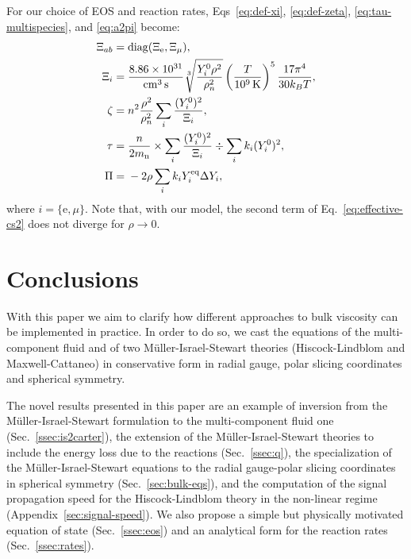 \documentclass[aps,prd,twocolumn,a4paper,floatfix,nofootbib,superscriptaddress,nofootinbib]{revtex4}
\newcommand{\re}{\mathrm{e}}
\newcommand{\rn}{\mathrm{n}}
\newcommand{\req}{\mathrm{eq}}
\begin{document}
For our choice of EOS and reaction rates, Eqs~\eqref{eq:def-xi}, \eqref{eq:def-zeta}, \eqref{eq:tau-multispecies},
and \eqref{eq:a2pi} become:
%
\begin{align}
\Xi_{ab}={}& \mathrm{diag}(\Xi_\re,\Xi_\mu),\\
\Xi_i={}& \frac{8.86\times10^{31}}{\unit{cm^{3}\,s}}\sqrt[3]{\frac{Y^0_i\rho^2}{\rho^2_n}}
\left(\frac{T}{\unit[10^9]{K}}\right)^5
\frac{17\pi^4}{30k_BT},\\
\zeta={}&n^2\frac{\rho^2}{\rho_n^2}\sum_i\frac{(Y^0_i)^2}{\Xi_i},\\
\tau={}&\frac{n}{2m_\rn}\times\sum_i{\frac{(Y_i^0)^2}{\Xi_i}}\div\sum_i{k_i(Y_i^0)^2},\\
\Pi={}&-2\rho\sum_i k_i Y^\req_i \Delta Y_i,
\end{align}
where $i=\{\re,\mu\}$.
Note that, with our model, the second term of Eq.~\eqref{eq:effective-cs2} does not
diverge for $\rho\to0$.

\section{Conclusions}
\label{sec:conclusions}

With this paper we aim to clarify how different approaches to bulk viscosity
can be implemented in practice.
%
In order to do so, we cast the equations of the multi-component fluid and of
two M\"uller-Israel-Stewart theories (Hiscock-Lindblom and Maxwell-Cattaneo) in
conservative form in radial gauge, polar slicing coordinates and spherical
symmetry.

The novel results presented in this paper are an example of
inversion from the M\"uller-Israel-Stewart formulation to the multi-component
fluid one (Sec.~\ref{ssec:is2carter}), the extension of the
M\"uller-Israel-Stewart theories to include the energy loss due to the
reactions (Sec.~\ref{ssec:q}), the specialization of the
M\"uller-Israel-Stewart equations to the radial gauge-polar slicing coordinates
in spherical symmetry (Sec.~\ref{sec:bulk-eqs}), and the computation of the
signal propagation speed for the Hiscock-Lindblom theory in the non-linear
regime (Appendix~\ref{sec:signal-speed}).  We also propose a simple but
physically motivated equation of state (Sec.~\ref{ssec:eos}) and an analytical
form for the reaction rates (Sec.~\ref{ssec:rates}).
\end{document}
